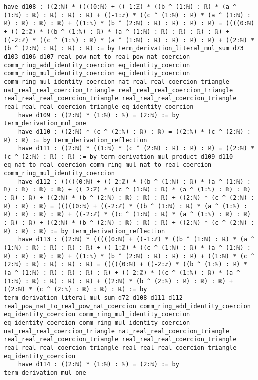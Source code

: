\documentclass{article}
\begin{document}
\begin{tcolorbox}[colback=white!10, width=\linewidth]
\begin{lstlisting}[language=Lean4]
    have d108 : ((2:ℕ) * ((((0:ℕ) + ((-1:ℤ) * ((b ^ (1:ℕ) : ℝ) * (a ^ (1:ℕ) : ℝ) : ℝ) : ℝ) : ℝ) + ((-1:ℤ) * ((c ^ (1:ℕ) : ℝ) * (a ^ (1:ℕ) : ℝ) : ℝ) : ℝ) : ℝ) + ((1:ℕ) * (b ^ (2:ℕ) : ℝ) : ℝ) : ℝ) : ℝ) = ((((0:ℕ) + ((-2:ℤ) * ((b ^ (1:ℕ) : ℝ) * (a ^ (1:ℕ) : ℝ) : ℝ) : ℝ) : ℝ) + ((-2:ℤ) * ((c ^ (1:ℕ) : ℝ) * (a ^ (1:ℕ) : ℝ) : ℝ) : ℝ) : ℝ) + ((2:ℕ) * (b ^ (2:ℕ) : ℝ) : ℝ) : ℝ) := by term_derivation_literal_mul_sum d73 d103 d106 d107 real_pow_nat_to_real_pow_nat_coercion comm_ring_add_identity_coercion eq_identity_coercion comm_ring_mul_identity_coercion eq_identity_coercion comm_ring_mul_identity_coercion nat_real_real_coercion_triangle nat_real_real_coercion_triangle real_real_real_coercion_triangle real_real_real_coercion_triangle real_real_real_coercion_triangle real_real_real_coercion_triangle eq_identity_coercion
    have d109 : ((2:ℕ) * (1:ℕ) : ℕ) = (2:ℕ) := by term_derivation_mul_one
    have d110 : ((2:ℕ) * (c ^ (2:ℕ) : ℝ) : ℝ) = ((2:ℕ) * (c ^ (2:ℕ) : ℝ) : ℝ) := by term_derivation_reflection
    have d111 : ((2:ℕ) * ((1:ℕ) * (c ^ (2:ℕ) : ℝ) : ℝ) : ℝ) = ((2:ℕ) * (c ^ (2:ℕ) : ℝ) : ℝ) := by term_derivation_mul_product d109 d110 eq_nat_to_real_coercion comm_ring_mul_nat_to_real_coercion comm_ring_mul_identity_coercion
    have d112 : (((((0:ℕ) + ((-2:ℤ) * ((b ^ (1:ℕ) : ℝ) * (a ^ (1:ℕ) : ℝ) : ℝ) : ℝ) : ℝ) + ((-2:ℤ) * ((c ^ (1:ℕ) : ℝ) * (a ^ (1:ℕ) : ℝ) : ℝ) : ℝ) : ℝ) + ((2:ℕ) * (b ^ (2:ℕ) : ℝ) : ℝ) : ℝ) + ((2:ℕ) * (c ^ (2:ℕ) : ℝ) : ℝ) : ℝ) = (((((0:ℕ) + ((-2:ℤ) * ((b ^ (1:ℕ) : ℝ) * (a ^ (1:ℕ) : ℝ) : ℝ) : ℝ) : ℝ) + ((-2:ℤ) * ((c ^ (1:ℕ) : ℝ) * (a ^ (1:ℕ) : ℝ) : ℝ) : ℝ) : ℝ) + ((2:ℕ) * (b ^ (2:ℕ) : ℝ) : ℝ) : ℝ) + ((2:ℕ) * (c ^ (2:ℕ) : ℝ) : ℝ) : ℝ) := by term_derivation_reflection
    have d113 : ((2:ℕ) * (((((0:ℕ) + ((-1:ℤ) * ((b ^ (1:ℕ) : ℝ) * (a ^ (1:ℕ) : ℝ) : ℝ) : ℝ) : ℝ) + ((-1:ℤ) * ((c ^ (1:ℕ) : ℝ) * (a ^ (1:ℕ) : ℝ) : ℝ) : ℝ) : ℝ) + ((1:ℕ) * (b ^ (2:ℕ) : ℝ) : ℝ) : ℝ) + ((1:ℕ) * (c ^ (2:ℕ) : ℝ) : ℝ) : ℝ) : ℝ) = (((((0:ℕ) + ((-2:ℤ) * ((b ^ (1:ℕ) : ℝ) * (a ^ (1:ℕ) : ℝ) : ℝ) : ℝ) : ℝ) + ((-2:ℤ) * ((c ^ (1:ℕ) : ℝ) * (a ^ (1:ℕ) : ℝ) : ℝ) : ℝ) : ℝ) + ((2:ℕ) * (b ^ (2:ℕ) : ℝ) : ℝ) : ℝ) + ((2:ℕ) * (c ^ (2:ℕ) : ℝ) : ℝ) : ℝ) := by term_derivation_literal_mul_sum d72 d108 d111 d112 real_pow_nat_to_real_pow_nat_coercion comm_ring_add_identity_coercion eq_identity_coercion comm_ring_mul_identity_coercion eq_identity_coercion comm_ring_mul_identity_coercion nat_real_real_coercion_triangle nat_real_real_coercion_triangle real_real_real_coercion_triangle real_real_real_coercion_triangle real_real_real_coercion_triangle real_real_real_coercion_triangle eq_identity_coercion
    have d114 : ((2:ℕ) * (1:ℕ) : ℕ) = (2:ℕ) := by term_derivation_mul_one

\end{lstlisting}
\end{tcolorbox}
\end{document}
